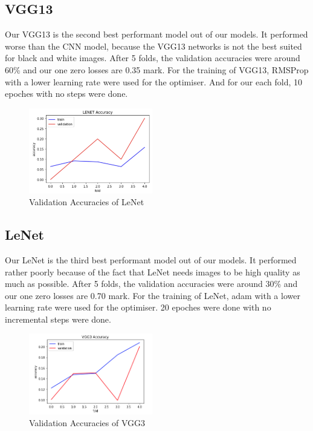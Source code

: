 \subsection{VGG13}
Our VGG13 is the second best performant model out of our models. It performed worse than the CNN model, because the VGG13 networks is not the best suited for black and white images. After 5 folds, the validation accuracies were around 60\% and our one zero losses are 0.35 mark. For the training of VGG13, RMSProp with a lower learning rate were used for the optimiser. And for our each fold, 10 epoches with no steps were done.


\begin{figure}
    \centering
    \includegraphics[width=0.48\textwidth]{Images/lenet.png}
    \caption{Validation Accuracies of LeNet}
    \label{fig:NTNU-letters}
\end{figure}
\subsection{LeNet}
Our LeNet is the third best performant model out of our models. It performed rather poorly because of the fact that LeNet needs images to be high quality as much as possible. After 5 folds, the validation accuracies were around 30\% and our one zero losses are 0.70 mark. For the training of LeNet, adam with a lower learning rate were used for the optimiser. 20 epoches were done with no incremental steps were done.
\begin{figure}
    \centering
    \includegraphics[width=0.48\textwidth]{Images/vgg3.png}
    \caption{Validation Accuracies of VGG3}
    \label{fig:NTNU-letters}
\end{figure}
